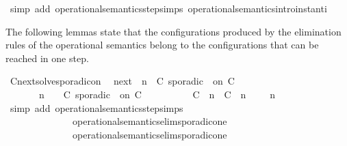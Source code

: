 \begin{isabellebody}
%
\isadelimproof
%
\endisadelimproof
%
\isatagproof
{}\isamarkupfalse%
\ {\isacharparenleft}simp\ add{\isacharcolon}\ operational{\isacharunderscore}semantics{\isacharunderscore}step{\isachardot}simps\ operational{\isacharunderscore}semantics{\isacharunderscore}intro{\isachardot}instant{\isacharunderscore}i{\isacharparenright}%
\endisatagproof
{\isafoldproof}%
%
\isadelimproof
%
\endisadelimproof
%
\begin{isamarkuptext}%
The following lemmas state that the configurations produced by the elimination 
  rules of the operational semantics belong to the configurations that can be 
  reached in one step.%
\end{isamarkuptext}\isamarkuptrue%
\isamarkupfalse%
\ Cnext{\isacharunderscore}solve{\isacharunderscore}sporadicon{\isacharcolon}\isanewline
\ \ {\isacartoucheopen}{\isacharparenleft}{\isasymC}\isactrlsub n\isactrlsub e\isactrlsub x\isactrlsub t\ {\isacharparenleft}{\isasymGamma}{\isacharcomma}\ n\ {\isasymturnstile}\ {\isacharparenleft}{\isacharparenleft}C\ sporadic\ {\isasymtau}\ on\ C\ {\isacharhash}\ {\isasymPsi}{\isacharparenright}\ {\isasymtriangleright}\ {\isasymPhi}{\isacharparenright}{\isacharparenright}\isanewline
\ \ \ \ {\isasymsupseteq}\ {\isacharbraceleft}\ {\isasymGamma}{\isacharcomma}\ n\ {\isasymturnstile}\ {\isasymPsi}\ {\isasymtriangleright}\ {\isacharparenleft}{\isacharparenleft}C\ sporadic\ {\isasymtau}\ on\ C\ {\isacharhash}\ {\isasymPhi}{\isacharparenright}{\isacharcomma}\isanewline
\ \ \ \ \ \ \ \ {\isacharparenleft}{\isacharparenleft}C\ {\isasymUp}\ n{\isacharparenright}\ {\isacharhash}\ {\isacharparenleft}C\ {\isasymDown}\ n\ {\isacharat}\ {\isasymtau}{\isacharparenright}\ {\isacharhash}\ {\isasymGamma}{\isacharparenright}{\isacharcomma}\ n\ {\isasymturnstile}\ {\isasymPsi}\ {\isasymtriangleright}\ {\isasymPhi}\ {\isacharbraceright}{\isacartoucheclose}\isanewline
%
\isadelimproof
%
\endisadelimproof
%
\isatagproof
{}\isamarkupfalse%
\ {\isacharparenleft}simp\ add{\isacharcolon}\ operational{\isacharunderscore}semantics{\isacharunderscore}step{\isachardot}simps\isanewline
\ \ \ \ \ \ \ \ \ \ \ \ \ \ operational{\isacharunderscore}semantics{\isacharunderscore}elim{\isachardot}sporadic{\isacharunderscore}on{\isacharunderscore}e{}\isanewline
\ \ \ \ \ \ \ \ \ \ \ \ \ \ operational{\isacharunderscore}semantics{\isacharunderscore}elim{\isachardot}sporadic{\isacharunderscore}on{\isacharunderscore}e{}{\isacharparenright}%

\end{isabellebody}
